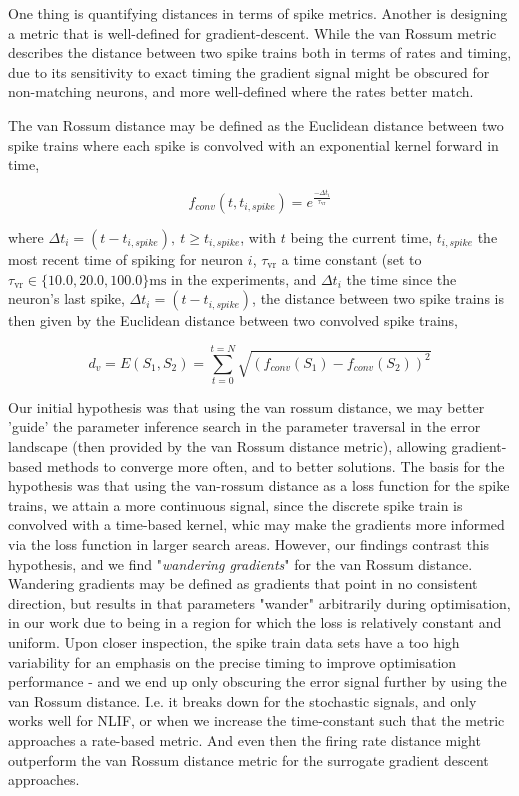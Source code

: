 \documentclass[mphil,deptreport,ianc]{infthesis} %
\begin{document}
One thing is quantifying distances in terms of spike metrics.
Another is designing a metric that is well-defined for gradient-descent.
While the van Rossum metric describes the distance between two spike trains both in terms of rates and timing, due to its sensitivity to exact timing the gradient signal might be obscured for non-matching neurons, and more well-defined where the rates better match.

The van Rossum distance \cite{VanRossum2001} may be defined as the Euclidean distance between two spike trains where each spike is convolved with an exponential kernel forward in time,

\begin{equation}
    f_{conv}(t, t_{i, spike}) = e^{\frac{-\Delta t_i}{\tau_{\mathrm{vr}}}}
\end{equation}

where $\Delta t_i = (t-t_{i, spike}),\ t \geq t_{i,spike}$, 
with $t$ being the current time, $t_{i,spike}$ the most recent time of spiking for neuron $i$, $\tau_{\mathrm{vr}}$ a time constant (set to $\tau_{\mathrm{vr}} \in \{10.0, 20.0, 100.0\} \si{\ms}$ in the experiments, and $\Delta t_i$ the time since the neuron's last spike, $\Delta t_i = (t-t_{i, spike})$, the distance between two spike trains is then given by the Euclidean distance between two convolved spike trains,


\begin{equation}
    d_v = E(S_1, S_2) = \sum_{t=0}^{t=N} \sqrt{(f_{conv}(S_1)-f_{conv}(S_2))^2}
\end{equation}


Our initial hypothesis was that using the van rossum distance, we may better 'guide' the parameter inference search in the parameter traversal in the error landscape (then provided by the van Rossum distance metric), allowing gradient-based methods to converge more often, and to better solutions.
The basis for the hypothesis was that using the van-rossum distance as a loss function for the spike trains, we attain a more continuous signal, since the discrete spike train is convolved with a time-based kernel, whic may make the gradients more informed via the loss function in larger search areas.
However, our findings contrast this hypothesis, and we find "\textit{wandering gradients}" for the van Rossum distance.
Wandering gradients may be defined as gradients that point in no consistent direction, but results in that parameters "wander" arbitrarily during optimisation, in our work due to being in a region for which the loss is relatively constant and uniform.
Upon closer inspection, the spike train data sets have a too high variability for an emphasis on the precise timing to improve optimisation performance - and we end up only obscuring the error signal further by using the van Rossum distance. 
I.e. it breaks down for the stochastic signals, and only works well for NLIF, or when we increase the time-constant such that the metric approaches a rate-based metric. And even then the firing rate distance might outperform the van Rossum distance metric for the surrogate gradient descent approaches.
\end{document}
